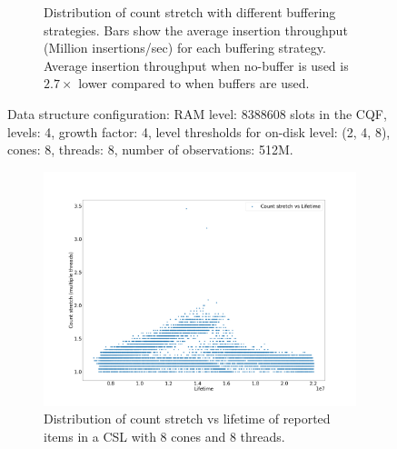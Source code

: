 \begin{figure}
{\begin{subfigure}{.50\textwidth}
  \captionsetup{margin=.5cm}
  \caption{Distribution of count stretch with different
  buffering strategies. Bars show the average insertion throughput
  (Million insertions/sec) for each buffering strategy. Average insertion throughput when
  no-buffer is used is $2.7\times$ lower compared to when buffers are used.}
  \label{fig:countstretch-buffering}
\end{subfigure}
}
\caption{Data structure configuration: RAM level: 8388608 slots in
    the CQF, levels: 4, growth factor: 4, level thresholds for on-disk
    level: (2, 4, 8), cones: 8, threads: 8, number of
  observations: 512M.
}
\label{fig:roboustness}
\end{figure}


\begin{figure}
{\centering
\begin{subfigure}{.50\textwidth}
  \centering
  \includegraphics[width=\linewidth]{../LERT-src/sigmod20_figs/countstretch-lifetime.png}
  \captionsetup{margin=.5cm}
  \caption{Distribution of count stretch vs lifetime of reported items in a
    CSL with 8 cones and 8 threads.}
  \label{fig:countstretch-analysis}
\end{subfigure}
\\
\begin{subfigure}{.50\textwidth}
  \centering

\end{subfigure}}
\end{figure}
